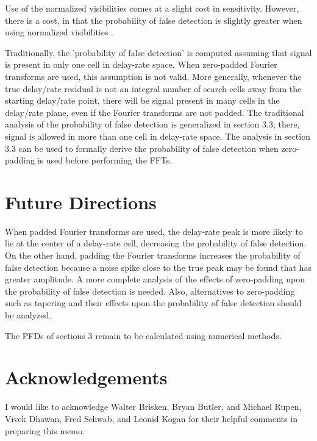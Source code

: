 Use of the normalized visibilities comes at a slight cost in sensitivity.
However, there is a cost, in that the probability of false detection is
slightly greater when using normalized visibilities .

Traditionally, the 'probability of false detection' is computed
assuming that signal is present in only one cell in delay-rate space.
When zero-padded Fourier transforms are used, this assumption is not
valid.  More generally, whenever the true delay/rate residual is not
an integral number of search cells away from the starting delay/rate
point, there will be signal present in many cells in the delay/rate
plane, even if the Fourier transforms are not padded.  The traditional
analysis of the probability of false detection is generalized in
section 3.3; there, signal is allowed in more than one cell in
delay-rate space.  The analysis in section 3.3 can be used to formally
derive the probability of false detection when zero-padding is used
before performing the FFTs.

\section{Future Directions}


When padded Fourier transforms are used, the delay-rate peak is more
likely to lie at the center of a delay-rate cell, decreasing the
probability of false detection.  On the other hand, padding the
Fourier transforms increases the probability of false detection
because a noise spike close to the true peak may be found that has
greater amplitude.  A more complete analysis of the effects of
zero-padding upon the probability of false detection is needed.  Also,
alternatives to zero-padding such as tapering and their effects upon
the probability of false detection should be analyzed.

The PFDs of sections 3 remain to be calculated using numerical
methods.

\section{Acknowledgements}

I would like to acknowledge Walter Brisken, Bryan Butler, and Michael
Rupen, Vivek Dhawan, Fred Schwab, and Leonid Kogan for their helpful
comments in preparing this memo.



